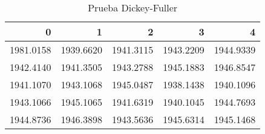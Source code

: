 \begin{table}[H]
\label{tab:dickey_fuller}
\centering
\begin{tabular}{rrrrr}
\toprule
0 & 1 & 2 & 3 & 4 \\
\midrule
1981.0158 & 1939.6620 & 1941.3115 & 1943.2209 & 1944.9339 \\
1942.4140 & 1941.3505 & 1943.2788 & 1945.1883 & 1946.8547 \\
1941.1070 & 1943.1068 & 1945.0487 & 1938.1438 & 1940.1096 \\
1943.1066 & 1945.1065 & 1941.6319 & 1940.1045 & 1944.7693 \\
1944.8736 & 1946.3898 & 1943.5636 & 1945.6314 & 1945.1468 \\
\bottomrule
\end{tabular}
\caption{Prueba Dickey-Fuller}
\end{table}
